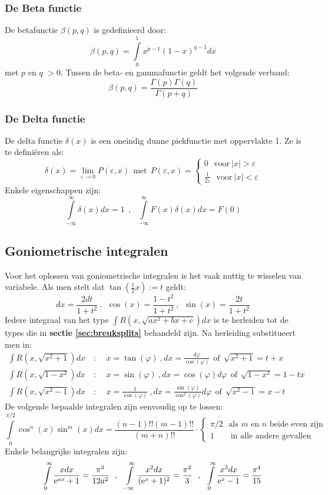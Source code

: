 \documentclass[twoside]{report}
\begin{document}
\subsubsection{De Beta functie}
De betafunctie $\beta(p,q)$ is gedefinieerd door:
\[
\beta(p,q)=\int\limits_0^1x^{p-1}(1-x)^{q-1}dx
\]
met $p$ en $q$ $>0$. Tussen de beta- en gammafunctie geldt het volgende
verband:
\[
\beta(p,q)=\frac{\Gamma(p)\Gamma(q)}{\Gamma(p+q)}
\]

\subsubsection{De Delta functie}
De delta functie $\delta(x)$ is een oneindig dunne piekfunctie met oppervlakte
1. Ze is te defini\"eren als:
\[
\delta(x)=\lim_{\varepsilon\rightarrow0}P(\varepsilon,x)~~\mbox{met}~~
P(\varepsilon,x)=\left\{
\begin{array}{l}
0~~~\mbox{voor}~|x|>\varepsilon\\
\displaystyle\frac{1}{2\varepsilon}~~~\mbox{voor}~|x|<\varepsilon
\end{array}\right.
\]
Enkele eigenschappen zijn:
\[
\int\limits_{-\infty}^\infty\delta(x)dx=1~~,~~~
\int\limits_{-\infty}^\infty F(x)\delta(x)dx=F(0)
\]

\subsection{Goniometrische integralen}
Voor het oplossen van goniometrische integralen is het vaak nuttig te wisselen
van variabele. Als men stelt dat $\tan(\frac{1}{2}x):=t$ geldt:
\[
dx=\frac{2dt}{1+t^2}~,~~\cos(x)=\frac{1-t^2}{1+t^2}~,~~\sin(x)=\frac{2t}{1+t^2}
\]
Iedere integraal van het type $\int R(x,\sqrt{ax^2+bx+c})dx$ is te herleiden
tot de types die in {\bf sectie \ref{sec:breuksplits}} behandeld zijn. Na
herleiding substitueert men in:
\begin{eqnarray*}
\int R(x,\sqrt{x^2+1})dx&~:~~&x=\tan(\varphi)          ~,dx=\frac{d\varphi}{\cos(\varphi)}               ~~\mbox{of}~~\sqrt{x^2+1}=t+x\\
\int R(x,\sqrt{1-x^2})dx&~:~~&x=\sin(\varphi)          ~,dx=\cos(\varphi)d\varphi                        ~~\mbox{of}~~\sqrt{1-x^2}=1-tx\\
\int R(x,\sqrt{x^2-1})dx&~:~~&x=\frac{1}{\cos(\varphi)}~,dx=\frac{\sin(\varphi)}{\cos^2(\varphi)}d\varphi~~\mbox{of}~~\sqrt{x^2-1}=x-t
\end{eqnarray*}
De volgende bepaalde integralen zijn eenvoudig op te lossen:
\[
\int\limits_0^{\pi/2}\cos^n(x)\sin^m(x)dx=\frac{(n-1)!!(m-1)!!}{(m+n)!!}\cdot
\left\{\begin{array}{l}
\pi/2\mbox{~~als $m$ en $n$ beide even zijn}\\
1\mbox{~~~~~~in alle andere gevallen}
\end{array}\right.
\]
Enkele belangrijke integralen zijn:
\[
\int\limits_0^\infty\frac{xdx}{{\rm e}^{ax}+1}=\frac{\pi^2}{12a^2}~~,~~
\int\limits_{-\infty}^\infty\frac{x^2dx}{({\rm e}^x+1)^2}=\frac{\pi^2}{3}~~,~~
\int\limits_0^\infty\frac{x^3dx}{{\rm e}^x-1}=\frac{\pi^4}{15}
\]
\end{document}
